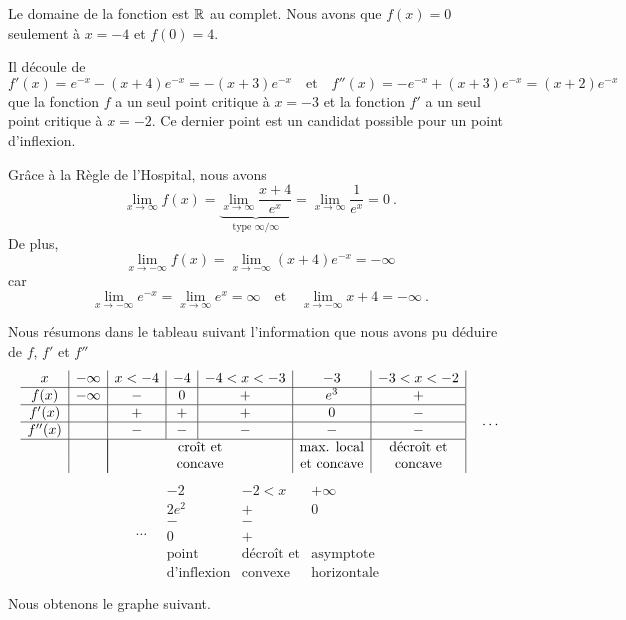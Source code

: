 { Le domaine de la fonction est $\mathbb{R}$ au complet.
Nous avons que $f(x)=0$ seulement à $x=-4$ et $f(0) = 4$.

Il découle de
\[
f'(x) = e^{-x}-(x+4)e^{-x} = -(x+3)e^{-x} \quad \text{et} \quad
f''(x) = -e^{-x} + (x+3)e^{-x} = (x+2)e^{-x}
\]
que la fonction $f$ a un seul point critique à $x=-3$ et la fonction $f'$
a un seul point critique à $x=-2$.  Ce dernier point est un candidat
possible pour un point d'inflexion.

Grâce à la Règle de l'Hospital, nous avons
\[
\lim_{x\rightarrow \infty} f(x)
= \underbrace{\lim_{x\rightarrow \infty} \frac{x+4}{e^x}
}_{\text{type }\infty/\infty}
= \lim_{x\rightarrow \infty} \frac{1}{e^x} = 0 \ .
\]
De plus,
\[
\lim_{x\rightarrow -\infty} f(x) = \lim_{x\rightarrow -\infty} (x+4)e^{-x}
= -\infty
\]
car
\[
\lim_{x\rightarrow -\infty} e^{-x} = \lim_{x\rightarrow \infty} e^x
= \infty \quad \text{et} \quad
\lim_{x\rightarrow -\infty} x+4 = -\infty \ .
\]

Nous résumons dans le tableau suivant l'information que nous avons pu
déduire de $f$, $f'$ et $f''$
\[
\begin{array}{c|c|c|c|c|c|c|}
x & -\infty & x<-4 & -4 & -4<x<-3 & -3 & -3<x<-2 \\
\hline
f(x) & -\infty & - & 0 & + & e^3 & + \\
\hline
f'(x) & & + & + & + & 0 & - \\
\hline
f''(x) & & - & - & - & - & - \\
\hline
& & \multicolumn{3}{|c|}{\text{croît et}} & \text{max. local} &
\text{décroît et} \\
& & \multicolumn{3}{|c|}{\text{concave}} & \text{et concave} &
\text{concave}
\end{array}\quad \ldots
\]
\[
\ldots \quad \begin{array}{|c|c|c}
-2 & -2<x & +\infty \\
\hline
2e^2 & + & 0 \\
\hline
- & - & \\
\hline
0 & + & \\
\hline
\text{point} & \text{décroît et} & \text{asymptote} \\
\text{d'inflexion} & \text{convexe} & \text{horizontale}
\end{array}
\]

Nous obtenons le graphe suivant.

}
